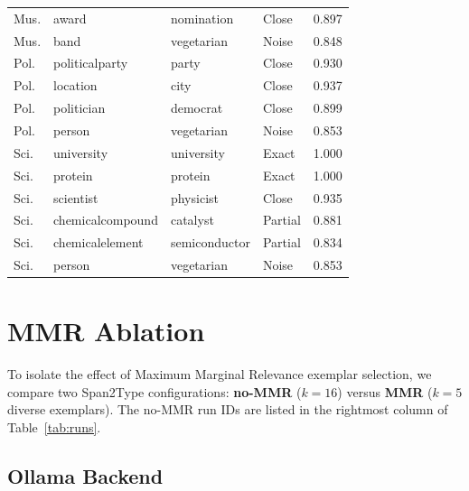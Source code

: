 \documentclass[11pt,a4paper]{article}
\begin{document}
\begin{table}[h]
\begin{tabularx}{\textwidth}{l l l l r}
Mus. & award         & \textcolor{orange!70!black}{nomination}  & Close   & 0.897 \\
Mus. & band          & \textcolor{red!70!black}{vegetarian}     & Noise   & 0.848 \\
\midrule
Pol. & politicalparty & \textcolor{orange!70!black}{party}      & Close   & 0.930 \\
Pol. & location      & \textcolor{orange!70!black}{city}        & Close   & 0.937 \\
Pol. & politician    & \textcolor{orange!70!black}{democrat}    & Close   & 0.899 \\
Pol. & person        & \textcolor{red!70!black}{vegetarian}     & Noise   & 0.853 \\
\midrule
Sci. & university    & \textcolor{green!60!black}{university}   & Exact   & 1.000 \\
Sci. & protein       & \textcolor{green!60!black}{protein}      & Exact   & 1.000 \\
Sci. & scientist     & \textcolor{orange!70!black}{physicist}   & Close   & 0.935 \\
Sci. & chemicalcompound & \textcolor{orange!70!black}{catalyst} & Partial & 0.881 \\
Sci. & chemicalelement & \textcolor{orange!70!black}{semiconductor} & Partial & 0.834 \\
Sci. & person        & \textcolor{red!70!black}{vegetarian}     & Noise   & 0.853 \\
\bottomrule
\end{tabularx}
\end{table}

\section{MMR Ablation}

To isolate the effect of Maximum Marginal Relevance exemplar selection,
we compare two Span2Type configurations:
\textbf{no-MMR} ($k{=}16$) versus
\textbf{MMR} ($k{=}5$ diverse exemplars).
The no-MMR run IDs are listed in the rightmost column of
Table~\ref{tab:runs}.

\subsection{Ollama Backend}
\end{document}

